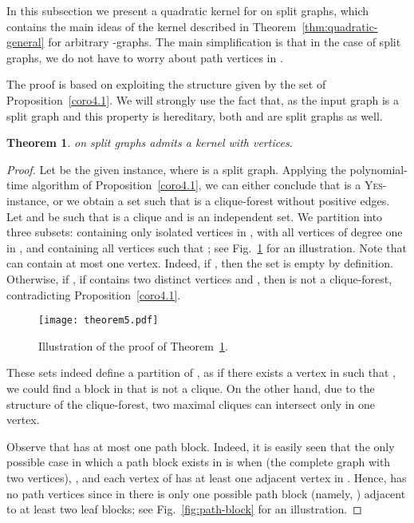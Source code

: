\documentclass[
final
]{dmtcs-episciences}
\newtheorem{theorem}{Theorem}{\bfseries}{\itshape}
\begin{document}
In this subsection we present a quadratic kernel for {} on split graphs, which contains the main ideas of the kernel described in Theorem~\ref{thm:quadratic-general} for arbitrary -graphs. The main simplification is that in the case of split graphs, we do not have to worry about path vertices in .

The proof is based on exploiting the structure given by the set  of Proposition~\ref{coro4.1}. We will strongly use the fact that, as  the input graph is a split graph and this property is hereditary, both  and  are split graphs as well.

     \begin{theorem}\label{thm:quadratic-split}
	{} on split graphs admits a kernel with  vertices.
	\end{theorem}
     \begin{proof}
     Let  be the given instance, where  is a split graph. Applying the polynomial-time algorithm of Proposition~\ref{coro4.1}, we can either conclude that  is a \textsc{Yes}-instance, or we obtain a set  such that  is a clique-forest without positive edges. Let  and  be such that  is a clique and  is an independent set. We partition  into three subsets:  containing only isolated vertices in ,  with all vertices of degree one in , and  containing all vertices  such that ; see Fig.~\ref{fig:quadratic-split} for an illustration. Note that  can contain at most one vertex. Indeed, if , then the set  is empty by definition. Otherwise, if , if  contains two distinct vertices  and , then  is not a clique-forest, contradicting Proposition~\ref{coro4.1}.

\begin{figure}[h]
\begin{center} \texttt{[image: theorem5.pdf]}
\caption{Illustration of the proof of Theorem~\ref{thm:quadratic-split}.} \label{fig:quadratic-split} \end{center}
\end{figure}


     These sets indeed define a partition of , as  if there exists a vertex  in  such that , we could find a block in  that is not a clique. On the other hand, due to the structure of the clique-forest, two maximal cliques can intersect only in one vertex.



     Observe that  has at most one path block. Indeed, it is easily seen that the only possible case in which a path block exists in  is when  (the complete graph with two vertices), , and each vertex of  has at least one adjacent vertex in . Hence,  has no path vertices since in  there is only one possible path block (namely, ) adjacent to at least two leaf blocks; see Fig.~\ref{fig:path-block} for an illustration.



\end{proof}
\end{document}
